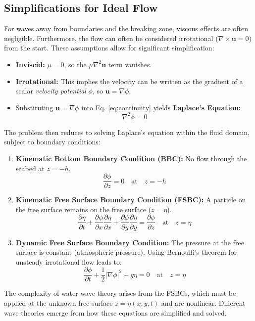 \documentclass[11pt,letterpaper]{article}
\begin{document}
    \subsection{Simplifications for Ideal Flow}
    For waves away from boundaries and the breaking zone, viscous effects are often negligible. Furthermore, the flow can often be considered irrotational ($\nabla \times \mathbf{u} = 0$) from the start. These assumptions allow for significant simplification:
    \begin{itemize}
        \item \textbf{Inviscid:} $\mu = 0$, so the $\mu \nabla^2 \mathbf{u}$ term vanishes.
        \item \textbf{Irrotational:} This implies the velocity can be written as the gradient of a scalar \emph{velocity potential} $\phi$, so $\mathbf{u} = \nabla \phi$.
        \item Substituting $\mathbf{u} = \nabla \phi$ into Eq. \ref{eq:continuity} yields \textbf{Laplace's Equation:}
        \begin{equation}
            \nabla^2 \phi = 0
            \label{eq:laplace}
        \end{equation}
    \end{itemize}
    The problem then reduces to solving Laplace's equation within the fluid domain, subject to boundary conditions:
    \begin{enumerate}
        \item \textbf{Kinematic Bottom Boundary Condition (BBC):} No flow through the seabed at $z = -h$.
        \begin{equation}
            \frac{\partial \phi}{\partial z} = 0 \quad \text{at} \quad z = -h
        \end{equation}
        \item \textbf{Kinematic Free Surface Boundary Condition (FSBC):} A particle on the free surface remains on the free surface ($z = \eta$).
        \begin{equation}
            \frac{\partial \eta}{\partial t} + \frac{\partial \phi}{\partial x}\frac{\partial \eta}{\partial x} + \frac{\partial \phi}{\partial y}\frac{\partial \eta}{\partial y} = \frac{\partial \phi}{\partial z} \quad \text{at} \quad z = \eta
        \end{equation}
        \item \textbf{Dynamic Free Surface Boundary Condition:} The pressure at the free surface is constant (atmospheric pressure). Using Bernoulli's theorem for unsteady irrotational flow leads to:
        \begin{equation}
            \frac{\partial \phi}{\partial t} + \frac{1}{2}|\nabla \phi|^2 + g\eta = 0 \quad \text{at} \quad z = \eta
        \end{equation}
    \end{enumerate}
    The complexity of water wave theory arises from the FSBCs, which must be applied at the unknown free surface $z=\eta(x,y,t)$ and are nonlinear. Different wave theories emerge from how these equations are simplified and solved.
\end{document}
